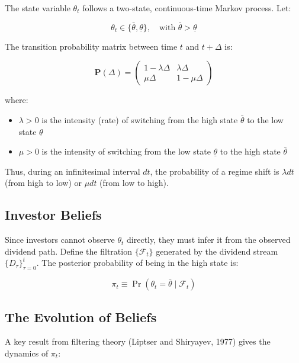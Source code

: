 \documentclass[12pt]{article}
\begin{document}
The state variable $\theta_t$ follows a two-state, continuous-time Markov process. Let:

\begin{equation}
\theta_t \in \{\bar{\theta}, \underline{\theta}\}, \quad \text{with } \bar{\theta} > \underline{\theta}
\end{equation}

The transition probability matrix between time $t$ and $t+\Delta$ is:

\begin{equation}
\mathbf{P}(\Delta) = \begin{pmatrix}
1 - \lambda\Delta & \lambda\Delta \\
\mu\Delta & 1 - \mu\Delta
\end{pmatrix}
\end{equation}

where:
\begin{itemize}
    \item $\lambda > 0$ is the intensity (rate) of switching from the high state $\bar{\theta}$ to the low state $\underline{\theta}$
    \item $\mu > 0$ is the intensity of switching from the low state $\underline{\theta}$ to the high state $\bar{\theta}$
\end{itemize}

Thus, during an infinitesimal interval $dt$, the probability of a regime shift is $\lambda dt$ (from high to low) or $\mu dt$ (from low to high).

\subsection{Investor Beliefs}

Since investors cannot observe $\theta_t$ directly, they must infer it from the observed dividend path. Define the filtration $\{\mathcal{F}_t\}$ generated by the dividend stream $\{D_\tau\}_{\tau=0}^t$. The posterior probability of being in the high state is:

\begin{equation}
\pi_t \equiv \Pr(\theta_t = \bar{\theta} \mid \mathcal{F}_t)
\end{equation}

\subsection{The Evolution of Beliefs}

A key result from filtering theory (Liptser and Shiryayev, 1977) gives the dynamics of $\pi_t$:
\end{document}
